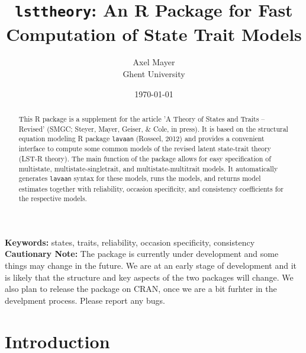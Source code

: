 \documentclass[10pt]{article}\usepackage{graphicx, color}
\begin{document}



\title{\texttt{lsttheory}: An \textsf{R}  Package for Fast Computation of State Trait Models}

\author{
  Axel Mayer\\
  Ghent University
}

\date{\today}
\maketitle

\begin{abstract}
This \textsf{R} \cite{RCoreTeam} package is a supplement for the article 'A Theory of States and Traits -- Revised' (SMGC; Steyer, Mayer, Geiser, \& Cole, in press). It is based on the structural equation modeling \textsf{R} package \texttt{lavaan} (Rosseel, 2012) and provides a convenient interface to compute some common models of the revised latent state-trait theory (LST-R theory). The main function of the package allows for easy specification of multistate, multistate-singletrait, and multistate-multitrait models. It automatically generates \texttt{lavaan} syntax for these models, runs the models, and returns model estimates together with reliability, occasion specificity, and consistency coefficients for the respective models. 
\end{abstract}

\noindent
{\bf Keywords:} states, traits, reliability, occasion specificity, consistency \\


\textbf{Cautionary Note:} The package is currently under development and some things may change in the future. We are at an early stage of development and it is likely that the structure and key aspects of the two packages will change. We also plan to release the package on CRAN, once we are a bit furhter in the develpment process. Please report any bugs.




\newpage
\tableofcontents

\newpage



\section{Introduction} \label{sec:intro}
\end{document}
